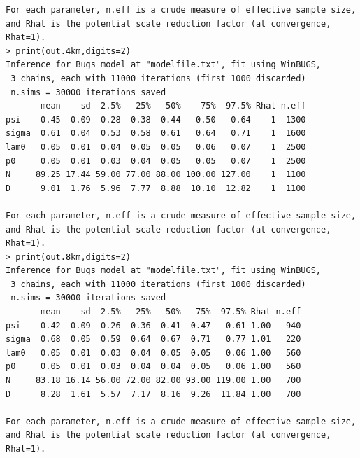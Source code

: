 {{\begin{verbatim}
For each parameter, n.eff is a crude measure of effective sample size,
and Rhat is the potential scale reduction factor (at convergence, Rhat=1).
> print(out.4km,digits=2)
Inference for Bugs model at "modelfile.txt", fit using WinBUGS,
 3 chains, each with 11000 iterations (first 1000 discarded)
 n.sims = 30000 iterations saved
       mean    sd  2.5%   25%   50%    75%  97.5% Rhat n.eff
psi    0.45  0.09  0.28  0.38  0.44   0.50   0.64    1  1300
sigma  0.61  0.04  0.53  0.58  0.61   0.64   0.71    1  1600
lam0   0.05  0.01  0.04  0.05  0.05   0.06   0.07    1  2500
p0     0.05  0.01  0.03  0.04  0.05   0.05   0.07    1  2500
N     89.25 17.44 59.00 77.00 88.00 100.00 127.00    1  1100
D      9.01  1.76  5.96  7.77  8.88  10.10  12.82    1  1100

For each parameter, n.eff is a crude measure of effective sample size,
and Rhat is the potential scale reduction factor (at convergence, Rhat=1).
> print(out.8km,digits=2)
Inference for Bugs model at "modelfile.txt", fit using WinBUGS,
 3 chains, each with 11000 iterations (first 1000 discarded)
 n.sims = 30000 iterations saved
       mean    sd  2.5%   25%   50%   75%  97.5% Rhat n.eff
psi    0.42  0.09  0.26  0.36  0.41  0.47   0.61 1.00   940
sigma  0.68  0.05  0.59  0.64  0.67  0.71   0.77 1.01   220
lam0   0.05  0.01  0.03  0.04  0.05  0.05   0.06 1.00   560
p0     0.05  0.01  0.03  0.04  0.04  0.05   0.06 1.00   560
N     83.18 16.14 56.00 72.00 82.00 93.00 119.00 1.00   700
D      8.28  1.61  5.57  7.17  8.16  9.26  11.84 1.00   700

For each parameter, n.eff is a crude measure of effective sample size,
and Rhat is the potential scale reduction factor (at convergence, Rhat=1).
\end{verbatim}
}


}
